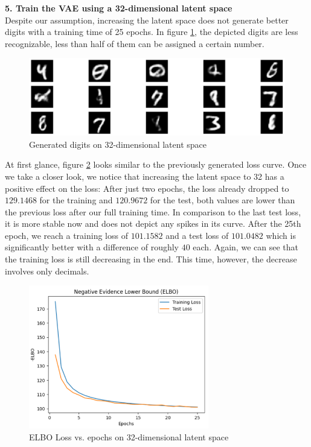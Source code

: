 \newpage
\textbf{5. Train the VAE using a 32-dimensional latent space} \\

Despite our assumption, increasing the latent space does not generate better digits with a training time of 25 epochs. In figure \ref{fig:generated-32}, the depicted digits are less recognizable, less than half of them can be assigned a certain number. \\


\begin{figure}[H]
    \centering
    \includegraphics[width=\textwidth]{images/3-generated-32.png}
    \caption{Generated digits on 32-dimensional latent space}
    \label{fig:generated-32}
\end{figure}

At first glance, figure \ref{fig:elbo32} looks similar to the previously generated loss curve. Once we take a closer look, we notice that increasing the latent space to 32 has a positive effect on the loss: After just two epochs, the loss already dropped to $129.1468$ for the training and $120.9672$ for the test, both values are lower than the previous loss after our full training time. In comparison to the last test loss, it is more stable now and does not depict any spikes in its curve. After the 25th epoch, we reach a training loss of $101.1582$ and a test loss of $101.0482$ which is significantly better with a difference of roughly $40$ each. Again, we can see that the training loss is still decreasing in the end. This time, however, the decrease involves only decimals.  

\begin{figure}[H]
    \centering
    \includegraphics[width=0.7\textwidth]{images/3-ELBO32.png}
    \caption{ELBO Loss vs. epochs on 32-dimensional latent space}
    \label{fig:elbo32}
\end{figure}

